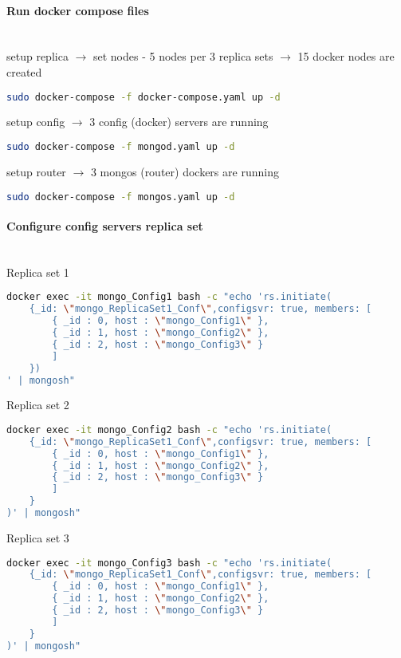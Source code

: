 \paragraph{Run docker compose files}\mbox{}\\
setup replica $\xrightarrow{}$ set nodes - 5 nodes per 3 replica sets $\xrightarrow{}$ 15 docker nodes are created
\begin{lstlisting}[language=Bash, caption=Create 15 Mongo nodes]
sudo docker-compose -f docker-compose.yaml up -d
\end{lstlisting}
setup config $\xrightarrow{}$ 3 config (docker) servers are running
\begin{lstlisting}[language=Bash, caption=Create config servers]
sudo docker-compose -f mongod.yaml up -d
\end{lstlisting}
setup router $\xrightarrow{}$ 3 mongos (router) dockers are running
\begin{lstlisting}[language=Bash, caption=Create router servers]
sudo docker-compose -f mongos.yaml up -d
\end{lstlisting}

\paragraph{Configure config servers replica set}\mbox{}\\
Replica set 1
\begin{lstlisting}[language=Bash, caption=Set config1]
docker exec -it mongo_Config1 bash -c "echo 'rs.initiate(
    {_id: \"mongo_ReplicaSet1_Conf\",configsvr: true, members: [
        { _id : 0, host : \"mongo_Config1\" },
        { _id : 1, host : \"mongo_Config2\" }, 
        { _id : 2, host : \"mongo_Config3\" }
        ]
    })
' | mongosh"
\end{lstlisting}
Replica set 2
\begin{lstlisting}[language=Bash, caption=Set config2]
docker exec -it mongo_Config2 bash -c "echo 'rs.initiate(
    {_id: \"mongo_ReplicaSet1_Conf\",configsvr: true, members: [
        { _id : 0, host : \"mongo_Config1\" },
        { _id : 1, host : \"mongo_Config2\" }, 
        { _id : 2, host : \"mongo_Config3\" }
        ]
    }
)' | mongosh"
\end{lstlisting}
Replica set 3
\begin{lstlisting}[language=Bash, caption=Set config3]
docker exec -it mongo_Config3 bash -c "echo 'rs.initiate(
    {_id: \"mongo_ReplicaSet1_Conf\",configsvr: true, members: [
        { _id : 0, host : \"mongo_Config1\" },
        { _id : 1, host : \"mongo_Config2\" }, 
        { _id : 2, host : \"mongo_Config3\" }
        ]
    }
)' | mongosh"
\end{lstlisting}

